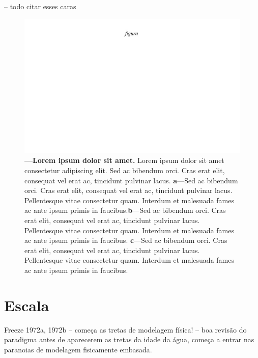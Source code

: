 \documentclass[./main.tex]{subfiles}
\begin{document}
 -- todo citar esses caras
\cite{seibert2003groundwater}
\cite{burns2001quantifying}

\begin{figure}[t!] 
\centering				
\includegraphics[width=0.95\linewidth]{figs/fig_m.jpg}		
\caption[Lorem ipsum dolor sit amet]
{\textbf{---\;Lorem ipsum dolor sit amet.}
    Lorem ipsum dolor sit amet consectetur adipiscing elit. Sed ac bibendum orci. Cras erat elit, consequat vel erat ac, tincidunt pulvinar lacus. \;\textbf{a}\;---\;Sed ac bibendum orci. Cras erat elit, consequat vel erat ac, tincidunt pulvinar lacus. Pellentesque vitae consectetur quam. Interdum et malesuada fames ac ante ipsum primis in faucibus.\;\textbf{b}\;---\;Sed ac bibendum orci. Cras erat elit, consequat vel erat ac, tincidunt pulvinar lacus. Pellentesque vitae consectetur quam. Interdum et malesuada fames ac ante ipsum primis in faucibus. \;\textbf{c}\;---\;Sed ac bibendum orci. Cras erat elit, consequat vel erat ac, tincidunt pulvinar lacus. Pellentesque vitae consectetur quam. Interdum et malesuada fames ac ante ipsum primis in faucibus.
}
\label{fig:hydro:paradox} 		
\end{figure}

\section{Escala} \label{sec:hydro:scale}

Freeze 1972a, 1972b -- começa as tretas de modelagem física!
\cite{Freeze1974} -- boa revisão do paradigma antes de aparecerem as tretas da idade da água, começa a entrar nas paranoias de modelagem fisicamente embasada.
\end{document}
